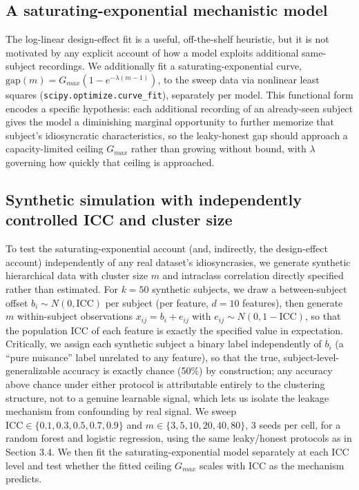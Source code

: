 \documentclass[11pt]{article}
\begin{document}
\subsection{A saturating-exponential mechanistic model}
The log-linear design-effect fit is a useful, off-the-shelf heuristic, but it is not motivated by any explicit account of how a model exploits additional same-subject recordings. We additionally fit a saturating-exponential curve, $\mathrm{gap}(m) = G_{max}\left(1 - e^{-\lambda(m-1)}\right)$, to the sweep data via nonlinear least squares (\texttt{scipy.optimize.curve\_fit}), separately per model. This functional form encodes a specific hypothesis: each additional recording of an already-seen subject gives the model a diminishing marginal opportunity to further memorize that subject's idiosyncratic characteristics, so the leaky-honest gap should approach a capacity-limited ceiling $G_{max}$ rather than growing without bound, with $\lambda$ governing how quickly that ceiling is approached.

\subsection{Synthetic simulation with independently controlled ICC and cluster size}
To test the saturating-exponential account (and, indirectly, the design-effect account) independently of any real dataset's idiosyncrasies, we generate synthetic hierarchical data with cluster size $m$ and intraclass correlation directly specified rather than estimated. For $k=50$ synthetic subjects, we draw a between-subject offset $b_i \sim N(0, \mathrm{ICC})$ per subject (per feature, $d=10$ features), then generate $m$ within-subject observations $x_{ij} = b_i + e_{ij}$ with $e_{ij} \sim N(0, 1-\mathrm{ICC})$, so that the population ICC of each feature is exactly the specified value in expectation. Critically, we assign each synthetic subject a binary label independently of $b_i$ (a ``pure nuisance'' label unrelated to any feature), so that the true, subject-level-generalizable accuracy is exactly chance (50\%) by construction; any accuracy above chance under either protocol is attributable entirely to the clustering structure, not to a genuine learnable signal, which lets us isolate the leakage mechanism from confounding by real signal. We sweep $\mathrm{ICC} \in \{0.1, 0.3, 0.5, 0.7, 0.9\}$ and $m \in \{3, 5, 10, 20, 40, 80\}$, 3 seeds per cell, for a random forest and logistic regression, using the same leaky/honest protocols as in Section 3.4. We then fit the saturating-exponential model separately at each ICC level and test whether the fitted ceiling $G_{max}$ scales with ICC as the mechanism predicts.
\end{document}

